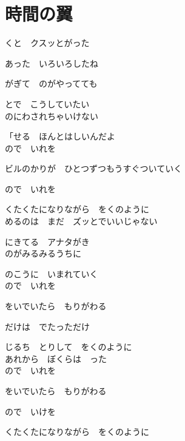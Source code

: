 \section{ 時間の翼}
\large{

くと　クスッとがった

あった　いろいろしたね

がぎて　のがやってても

とで　こうしていたい
\\

のにわされちゃいけない

「せる　ほんとはしいんだよ
\\

ので　いれを

ビルのかりが　ひとつずつもうすぐついていく

ので　いれを

くたくたになりながら　をくのように
\\

めるのは　まだ　ズッとでいいじゃない

にきてる　アナタがき
\\

のがみるみるうちに

のこうに　いまれていく
\\

ので　いれを

をいでいたら　もりがわる

だけは　でたっただけ

じるち　とりして　をくのように
\\

あれから　ぼくらは　った
\\

ので　いれを

をいでいたら　もりがわる

ので　いけを

くたくたになりながら　をくのように

}